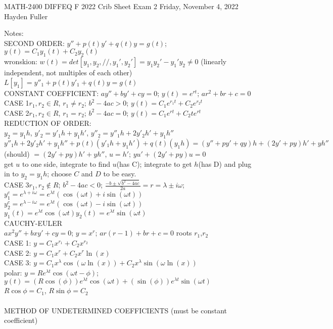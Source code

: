 \documentclass{article}
\begin{document}
MATH-2400 DIFFEQ F 2022 Crib Sheet Exam 2 Friday, November 4, 2022 Hayden Fuller
\begin{large}
\noindent Notes:
\\SECOND ORDER: $y''+p(t)y'+q(t)y=g(t)$; $y(t)=C_1y_1(t)+C_2y_2(t)$
\\wronskion: $w(t)=det[y_1,y_2,//,y_1',y_2']=y_1y_2'-y_1'y_2\ne0$ (linearly independent, not multiples of each other)
\\$L[y_1]=y''_1+p(t)y'_1+q(t)y=g(t)$
\\CONSTANT COEFFICIENT: $ay''+by'+cy=0$; $y(t)=e^{rt}$; $ar^2+br+c=0$
\\CASE 1$r_1,r_2\in R$, $r_1\ne r_2$; $b^2-4ac>0$; $y(t)=C_1e^{r_1t}+C_2e^{r_2t}$
\\CASE 2$r_1,r_2\in R$, $r_1=r_2$; $b^2-4ac=0$; $y(t)=C_1e^{rt}+C_2te^{rt}$
\\REDUCTION OF ORDER:
\\$y_2=y_1h$, $y'_2=y'_1h+y_1h'$, $y''_2=y''_1h+2y'_2h'+y_1h''$
\\$y''_1h+2y'_2h'+y_1h''+p(t)(y'_1h+y_1h')+q(t)(y_1h)=(y''+py'+qy)h+(2y'+py)h'+yh''$ (should) $=(2y'+py)h'+yh''$, $u=h'$; $yu'+(2y'+py)u=0$
\\get $u$ to one side, integrate to find $u$(has C); integrate to get $h$(has D) and plug in to $y_2=y_1h$; choose $C$ and $D$ to be easy.
\\CASE 3$r_1,r_2\not\in R$; $b^2-4ac<0$; $\frac{-b\pm\sqrt{b^2-4ac}}{2a}=r=\lambda\pm i\omega$; 
\\$y_1^c=e^{\lambda+i\omega}=e^{\lambda t}(\cos(\omega t)+i\sin(\omega  t))$
\\$y_2^c=e^{\lambda-i\omega}=e^{\lambda t}(\cos(\omega t)-i\sin(\omega  t))$
\\$y_1(t)=e^{\lambda t}\cos(\omega t)$\qquad$y_2(t)=e^{\lambda t}\sin(\omega t)$
\\CAUCHY-EULER
\\$ax^2y''+bxy'+cy=0$; $y=x^r$; $ar(r-1)+br+c=0$ roots $r_1$,$r_2$
\\CASE 1: $y=C_1x^{r_1}+C_2x^{r_2}$
\\CASE 2: $y=C_1x^r+C_2x^r\ln(x)$
\\CASE 3: $y=C_1x^{\lambda}\cos(\omega\ln(x))+C_2x^{\lambda}\sin(\omega\ln(x))$
\\polar: $y=Re^{\lambda t}\cos(\omega t-\phi)$; $y(t)=(R\cos(\phi))e^{\lambda t}\cos(\omega t)+(\sin(\phi))e^{\lambda t}\sin(\omega t)$
\\$R\cos\phi=C_1$, $R\sin\phi=C_2$
\\
\\METHOD OF UNDETERMINED COEFFICIENTS (must be constant coefficient)

\end{large}
\end{document}
